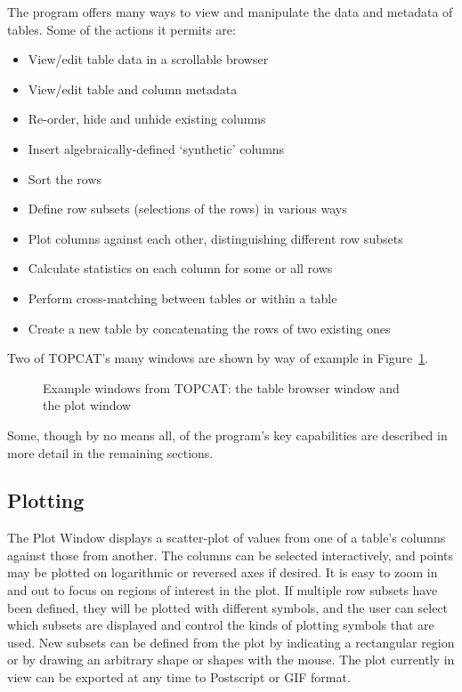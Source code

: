 \documentclass[11pt,twoside]{article}  %
\begin{document}
The program offers many ways to view and manipulate the data and metadata
of tables.  Some of the actions it permits are:
\begin{itemize}
\item View/edit table data in a scrollable browser
\item View/edit table and column metadata
\item Re-order, hide and unhide existing columns
\item Insert algebraically-defined `synthetic' columns
\item Sort the rows
\item Define row subsets (selections of the rows) in various ways 
\item Plot columns against each other, distinguishing different row subsets
\item Calculate statistics on each column for some or all rows
\item Perform cross-matching between tables or within a table
\item Create a new table by concatenating the rows of two existing ones
\end{itemize}
Two of TOPCAT's many windows are shown by way of example 
in Figure~\ref{FM-3-fig-tcwindows}.
\begin{figure}
\caption{Example windows from TOPCAT: the table browser window and
the plot window} 
\label{FM-3-fig-tcwindows}
\end{figure}
Some, though by no means all, of the program's key capabilities are 
described in more detail in the remaining sections.

\subsection{Plotting}

The Plot Window displays a scatter-plot of values from one of a table's
columns against those from another.  The columns can be selected 
interactively, and points may be plotted on logarithmic or reversed 
axes if desired.  
It is easy to zoom in and out to focus on regions of interest
in the plot.  If multiple row subsets have been defined, they will be
plotted with different symbols, and the user can select which subsets are 
displayed and control the kinds of plotting symbols that are used.  
New subsets can be defined from the plot by 
indicating a rectangular region or by drawing an arbitrary shape or shapes
with the mouse.
The plot currently in view can be exported at any time to Postscript or
GIF format.
\end{document}

